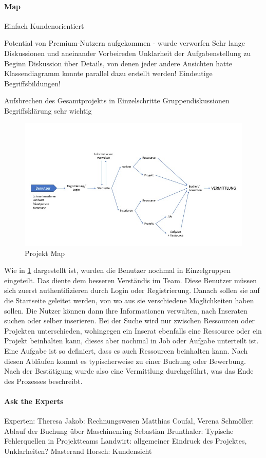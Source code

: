 \paragraph{Map}
Einfach
Kundenorientiert

Potential von Premium-Nutzern aufgekommen - wurde verworfen
Sehr lange Diskussionen und aneinander Vorbeireden
Unklarheit der Aufgabenstellung zu Beginn
Diskussion über Details, von denen jeder andere Ansichten hatte
Klassendiagramm konnte parallel dazu erstellt werden!
Eindeutige Begriffsbildungen!

Aufsbrechen des Gesamtprojekts in Einzelschritte
Gruppendiskussionen
Begriffsklärung sehr wichtig
\begin{figure}[h!]
	\includegraphics[width=\textwidth]{99_IMG/03_Sprint/map}
	\caption{Projekt Map}
	\label{fig:map}
\end{figure}

Wie in \ref{fig:map} dargestellt ist, wurden die Benutzer nochmal in Einzelgruppen eingeteilt. Das diente dem besseren Verständis im Team. Diese Benutzer müssen sich zuerst authentifizieren durch Login oder Registrierung. Danach sollen sie auf die Startseite geleitet werden, von wo aus sie verschiedene Möglichkeiten haben sollen. Die Nutzer können dann ihre Informationen verwalten, nach Inseraten suchen oder selber inserieren. Bei der Suche wird nur zwischen Ressourcen oder Projekten unterschieden, wohingegen ein Inserat ebenfalls eine Ressource oder ein Projekt beinhalten kann, dieses aber nochmal in Job oder Aufgabe unterteilt ist. Eine Aufgabe ist so definiert, dass es auch Ressourcen beinhalten kann. Nach diesen Abläufen kommt es typischerweise zu einer Buchung oder Bewerbung. Nach der Bestätigung wurde also eine Vermittlung durchgeführt, was das Ende des Prozesses beschreibt.

\paragraph{Ask the Experts}
Experten:
Theresa Jakob: Rechnungswesen
Matthias Coufal, Verena Schmöller: Ablauf der Buchung über Maschinenring
Sebastian Brunthaler: Typische Fehlerquellen in Projektteams
Landwirt: allgemeiner Eindruck des Projektes, Unklarheiten?
Masterand Horsch: Kundensicht

